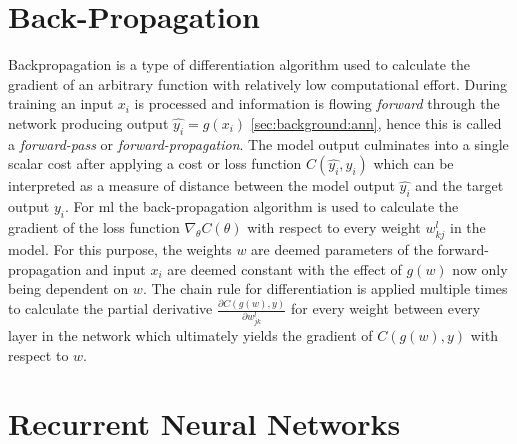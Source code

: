 \section{Back-Propagation} \label{sec:background:backprop}

Backpropagation is a type of differentiation algorithm used to calculate the gradient of an arbitrary function with relatively low computational effort. During training an input $x_i$
is processed and information is flowing \textit{forward} through the network producing output $\hat{y_i} = g(x_i)$ \ref{sec:background:ann}, hence this is called a \textit{forward-pass} or \textit{forward-propagation}. The model output culminates into a single scalar cost after applying a cost or loss function $C(\hat{y_i}, y_i)$ which can be interpreted as a measure of distance between the model output $\hat{y_i}$ and the target output $y_i$. For \gls{ml} the back-propagation algorithm is used to calculate the gradient of the loss function $\nabla_\theta C(\theta)$ with respect to every weight $w^l_{kj}$ in the model. For this purpose, the weights $w$ are deemed parameters of the forward-propagation and input $x_i$ are deemed constant with the effect of $g(w)$ now only being dependent on $w$. The 
chain rule for differentiation is applied multiple times to calculate the partial derivative $\frac{\partial C(g(w),y)}{\partial w^l_{jk}}$ for every weight between every layer in the network which ultimately yields the gradient of $C(g(w),y)$ with respect to $w$.

\section{Recurrent Neural Networks} \label{sec:background:rnn}

